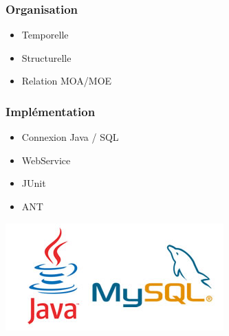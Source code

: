 \documentclass[handout]{beamer}
\begin{document}
\begin{frame}
	\frametitle{Organisation}
	\begin{itemize}
		\item Temporelle
		\item Structurelle
		\item Relation MOA/MOE
	\end{itemize}
\end{frame}

\begin{frame}
	\frametitle{Implémentation}
	\begin{itemize}
		\item Connexion Java / SQL
		\item WebService
		\item JUnit
		\item ANT
	\end{itemize}
	\begin{center}\includegraphics[scale=0.5]{java-mysql.jpg}\end{center}
\end{frame}
\end{document}

